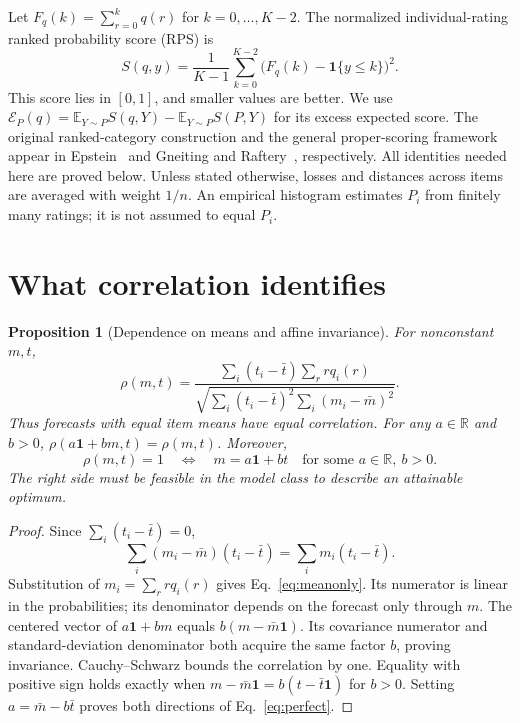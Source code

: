 \documentclass[11pt,letterpaper]{article}
\newtheorem{proposition}{Proposition}
\newcommand{\E}{\mathbb{E}}
\newcommand{\R}{\mathbb{R}}
\begin{document}
Let $F_q(k)=\sum_{r=0}^k q(r)$ for $k=0,\ldots,K-2$.
The normalized individual-rating ranked probability score (RPS) is
\begin{equation}\label{eq:rps}
 S(q,y)=\frac1{K-1}\sum_{k=0}^{K-2}\big(F_q(k)-\mathbf1\{y\le k\}\big)^2.
\end{equation}
This score lies in $[0,1]$, and smaller values are better.
We use $\mathcal E_P(q)=\E_{Y\sim P}S(q,Y)-\E_{Y\sim P}S(P,Y)$ for its excess expected score.
The original ranked-category construction and the general proper-scoring framework appear in Epstein~\cite{epstein1969} and Gneiting and Raftery~\cite{gneiting2007}, respectively.
All identities needed here are proved below.
Unless stated otherwise, losses and distances across items are averaged with weight $1/n$.
An empirical histogram estimates $P_i$ from finitely many ratings; it is not assumed to equal $P_i$.

\section{What correlation identifies}
\begin{proposition}[Dependence on means and affine invariance]\label{prop:invariance}
For nonconstant $m,t$,
\begin{equation}\label{eq:meanonly}
 \rho(m,t)=\frac{\sum_i(t_i-\bar t)\sum_r r q_i(r)}{\sqrt{\sum_i(t_i-\bar t)^2\sum_i(m_i-\bar m)^2}}.
\end{equation}
Thus forecasts with equal item means have equal correlation.
For any $a\in\R$ and $b>0$, $\rho(a\mathbf1+bm,t)=\rho(m,t)$.
Moreover,
\begin{equation}\label{eq:perfect}
 \rho(m,t)=1\quad\Longleftrightarrow\quad m=a\mathbf1+bt\quad\text{for some }a\in\R,\ b>0.
\end{equation}
The right side must be feasible in the model class to describe an attainable optimum.
\end{proposition}
\begin{proof}
Since $\sum_i(t_i-\bar t)=0$,
\[
 \sum_i(m_i-\bar m)(t_i-\bar t)=\sum_i m_i(t_i-\bar t).
\]
Substitution of $m_i=\sum_r r q_i(r)$ gives Eq.~\eqref{eq:meanonly}.
Its numerator is linear in the probabilities; its denominator depends on the forecast only through $m$.
The centered vector of $a\mathbf1+bm$ equals $b(m-\bar m\mathbf1)$.
Its covariance numerator and standard-deviation denominator both acquire the same factor $b$, proving invariance.
Cauchy--Schwarz bounds the correlation by one.
Equality with positive sign holds exactly when $m-\bar m\mathbf1=b(t-\bar t\mathbf1)$ for $b>0$.
Setting $a=\bar m-b\bar t$ proves both directions of Eq.~\eqref{eq:perfect}.
\end{proof}
\end{document}
